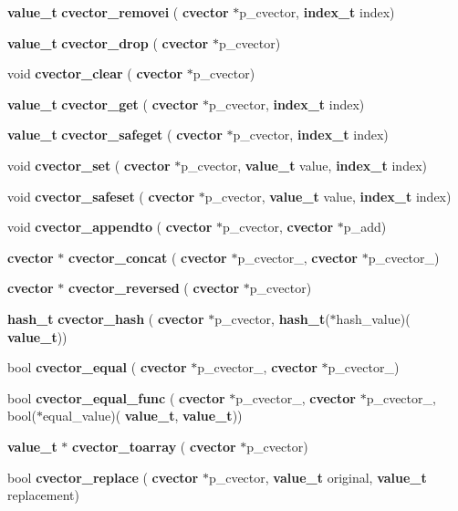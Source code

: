 \begin{DoxyCompactItemize}
\item 
\textbf{ value\+\_\+t} \textbf{ cvector\+\_\+removei} (\textbf{ cvector} $\ast$p\+\_\+cvector, \textbf{ index\+\_\+t} index)
\item 
\textbf{ value\+\_\+t} \textbf{ cvector\+\_\+drop} (\textbf{ cvector} $\ast$p\+\_\+cvector)
\item 
void \textbf{ cvector\+\_\+clear} (\textbf{ cvector} $\ast$p\+\_\+cvector)
\item 
\textbf{ value\+\_\+t} \textbf{ cvector\+\_\+get} (\textbf{ cvector} $\ast$p\+\_\+cvector, \textbf{ index\+\_\+t} index)
\item 
\textbf{ value\+\_\+t} \textbf{ cvector\+\_\+safeget} (\textbf{ cvector} $\ast$p\+\_\+cvector, \textbf{ index\+\_\+t} index)
\item 
void \textbf{ cvector\+\_\+set} (\textbf{ cvector} $\ast$p\+\_\+cvector, \textbf{ value\+\_\+t} value, \textbf{ index\+\_\+t} index)
\item 
void \textbf{ cvector\+\_\+safeset} (\textbf{ cvector} $\ast$p\+\_\+cvector, \textbf{ value\+\_\+t} value, \textbf{ index\+\_\+t} index)
\item 
void \textbf{ cvector\+\_\+appendto} (\textbf{ cvector} $\ast$p\+\_\+cvector, \textbf{ cvector} $\ast$p\+\_\+add)
\item 
\textbf{ cvector} $\ast$ \textbf{ cvector\+\_\+concat} (\textbf{ cvector} $\ast$p\+\_\+cvector\+\_, \textbf{ cvector} $\ast$p\+\_\+cvector\+\_)
\item 
\textbf{ cvector} $\ast$ \textbf{ cvector\+\_\+reversed} (\textbf{ cvector} $\ast$p\+\_\+cvector)
\item 
\textbf{ hash\+\_\+t} \textbf{ cvector\+\_\+hash} (\textbf{ cvector} $\ast$p\+\_\+cvector, \textbf{ hash\+\_\+t}($\ast$hash\+\_\+value)(\textbf{ value\+\_\+t}))
\item 
bool \textbf{ cvector\+\_\+equal} (\textbf{ cvector} $\ast$p\+\_\+cvector\+\_, \textbf{ cvector} $\ast$p\+\_\+cvector\+\_)
\item 
bool \textbf{ cvector\+\_\+equal\+\_\+func} (\textbf{ cvector} $\ast$p\+\_\+cvector\+\_, \textbf{ cvector} $\ast$p\+\_\+cvector\+\_, bool($\ast$equal\+\_\+value)(\textbf{ value\+\_\+t}, \textbf{ value\+\_\+t}))
\item 
\textbf{ value\+\_\+t} $\ast$ \textbf{ cvector\+\_\+toarray} (\textbf{ cvector} $\ast$p\+\_\+cvector)
\item 
bool \textbf{ cvector\+\_\+replace} (\textbf{ cvector} $\ast$p\+\_\+cvector, \textbf{ value\+\_\+t} original, \textbf{ value\+\_\+t} replacement)

\end{DoxyCompactItemize}
